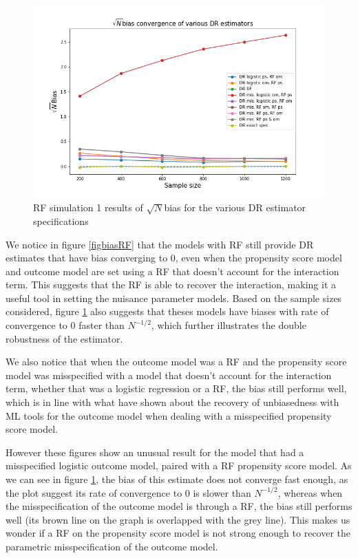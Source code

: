 \documentclass[12pt,twoside]{article}
\begin{document}
\begin{figure} 
    \centering
    \includegraphics[width = 0.9\columnwidth]{figures/sqrtnRF.png}
    \caption{RF simulation 1 results of $\sqrt{N}$bias for the various DR estimator specifications}
    \label{figsqrtnRF}
\end{figure}

We notice in figure \ref{figbiasRF} that the models with RF still provide DR estimates that have bias converging to 0, even when the propensity score model and outcome model are set using a RF that doesn't account for the interaction term. This suggests that the RF is able to recover the interaction, making it a useful tool in setting the nuisance parameter models. Based on the sample sizes considered, figure \ref{figsqrtnRF} also suggests that theses models have biases with rate of convergence to 0 faster than $N^{-1/2}$, which further illustrates the double robustness of the estimator.

We also notice that when the outcome model was a RF and the propensity score model was misspecified with a model that doesn't account for the interaction term, whether that was a logistic regression or a RF, the bias still performs well, which is in line with what \citet{ps_SL} have shown about the recovery of unbiasedness with ML tools for the outcome model when dealing with a misspecified propensity score model. 

However these figures show an unusual result for the model that had a misspecified logistic outcome model, paired with a RF propensity score model. As we can see in figure \ref{figsqrtnRF}, the bias of this estimate does not converge fast enough, as the plot suggest its rate of convergence to 0 is slower than $N^{-1/2}$, whereas when the misspecification of the outcome model is through a RF, the bias still performs well (its brown line on the graph is overlapped with the grey line). This makes us wonder if a RF on the propensity score model is not strong enough to recover the parametric misspecification of the outcome model.
\end{document}
